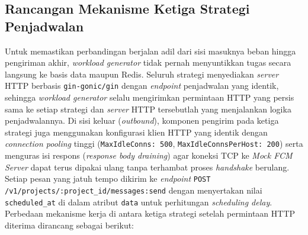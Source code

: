 \subsection{Rancangan Mekanisme Ketiga Strategi Penjadwalan} \label{III.Mekanisme_Strategi}
Untuk memastikan perbandingan berjalan adil dari sisi masuknya beban hingga pengiriman akhir, \textit{workload generator} tidak pernah menyuntikkan tugas secara langsung ke basis data maupun Redis. Seluruh strategi menyediakan \textit{server} HTTP berbasis \texttt{gin-gonic/gin} dengan \textit{endpoint} penjadwalan yang identik, sehingga \textit{workload generator} selalu mengirimkan permintaan HTTP yang persis sama ke setiap strategi dan \textit{server} HTTP tersebutlah yang menjalankan logika penjadwalannya. Di sisi keluar (\textit{outbound}), komponen pengirim pada ketiga strategi juga menggunakan konfigurasi klien HTTP yang identik dengan \textit{connection pooling} tinggi (\texttt{MaxIdleConns: 500}, \texttt{MaxIdleConnsPerHost: 200}) serta menguras isi respons (\textit{response body draining}) agar koneksi TCP ke \textit{Mock FCM Server} dapat terus dipakai ulang tanpa terhambat proses \textit{handshake} berulang. Setiap pesan yang jatuh tempo dikirim ke \textit{endpoint} \texttt{POST /v1/projects/:project\_id/messages:send} dengan menyertakan nilai \texttt{scheduled\_at} di dalam atribut \texttt{data} untuk perhitungan \textit{scheduling delay}. Perbedaan mekanisme kerja di antara ketiga strategi setelah permintaan HTTP diterima dirancang sebagai berikut: \par

